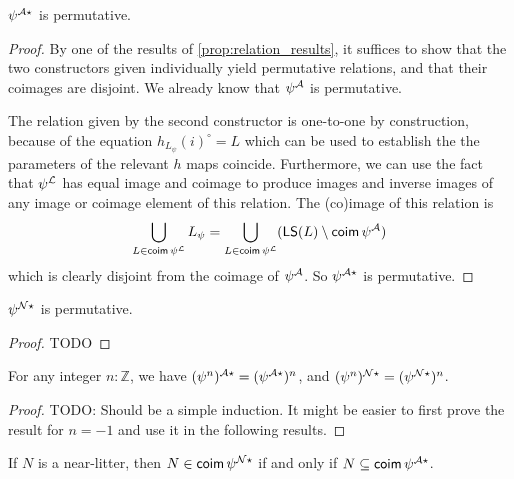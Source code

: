 \begin{proposition}
  \( \psi^{{\mathcal A}\star} \) is permutative.
\end{proposition}
\begin{proof}
  By one of the results of \cref{prop:relation_results}, it suffices to show that the two constructors given individually yield permutative relations, and that their coimages are disjoint.
  We already know that \( \psi^{\mathcal A} \) is permutative.

  The relation given by the second constructor is one-to-one by construction, because of the equation \( h_{L_\psi}(i)^\circ = L \) which can be used to establish the the parameters of the relevant \( h \) maps coincide.
  Furthermore, we can use the fact that \( \psi^{\mathcal L} \) has equal image and coimage to produce images and inverse images of any image or coimage element of this relation.
  The (co)image of this relation is
  \[ \bigcup_{L \in \operatorname{\mathsf{coim}} \psi^{\mathcal L}} L_\psi = \bigcup_{L \in \operatorname{\mathsf{coim}} \psi^{\mathcal L}} (\operatorname{\mathsf{LS}}(L) \setminus \operatorname{\mathsf{coim}} \psi^{\mathcal A}) \]
  which is clearly disjoint from the coimage of \( \psi^{\mathcal A} \).
  So \( \psi^{{\mathcal A}\star} \) is permutative.
\end{proof}
\begin{proposition}
  \( \psi^{{\mathcal N}\star} \) is permutative.
\end{proposition}
\begin{proof}
  TODO
\end{proof}
\begin{proposition}
  For any integer \( n : \mathbb Z \), we have \( (\psi^n)^{{\mathcal A}\star} = (\psi^{{\mathcal A}\star})^n \), and \( (\psi^n)^{{\mathcal N}\star} = (\psi^{{\mathcal N}\star})^n \).
\end{proposition}
\begin{proof}
  TODO: Should be a simple induction. It might be easier to first prove the result for \( n = -1 \) and use it in the following results.
\end{proof}
\begin{proposition}
  If \( N \) is a near-litter, then \( N \in \operatorname{\mathsf{coim}} \psi^{{\mathcal N}\star} \) if and only if \( N \subseteq \operatorname{\mathsf{coim}} \psi^{{\mathcal A}\star} \).
\end{proposition}
